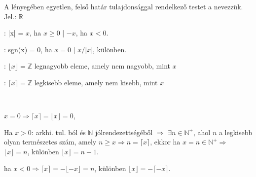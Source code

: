 \begin{frame}
\begin{tcolorbox}[title={Def.: Valós számok halmaza}]
  A lényegében egyetlen, felső határ tulajdonsággal rendelkező testet a  nevezzük.\\
  Jel.: $\mathbb{R}$
\end{tcolorbox}

\begin{tcolorbox}[title={Def.: néhány Függvény (?)}]
  : |x| = $x$, ha $x \geq 0$ | $-x$, ha $x < 0$.\\
  \msmallskip
  
  : sgn(x) = $0$, ha $x = 0$ | $x / |x|$, különben.\\
  \msmallskip
  
  : ${\lfloor}x{\rfloor} = \mathbb{Z}$ legnagyobb eleme, amely nem nagyobb, mint $x$\\
  \msmallskip
  
  : ${\lceil}x{\rceil} = \mathbb{Z}$ legkisebb eleme, amely nem kisebb, mint $x$\\
  \mbigskip

  \\
  \msmallskip

  $x = 0 \Rightarrow {\lceil}x{\rceil} = {\lfloor}x{\rfloor} = 0$,\\
  \msmallskip
  
  Ha $x > 0$: arkhi. tul. ból és $\mathbb{N}$ jólrendezettségéből $\Rightarrow$ ${\exists}n \in \mathbb{N}^+$, ahol $n$ a legkisebb olyan természetes szám, amely $n \geq x \Rightarrow n = {\lceil}x{\rceil}$, ekkor ha $x = n \in \mathbb{N}^+ \Rightarrow$ ${\lfloor}x{\rfloor} = n$, különben ${\lfloor}x{\rfloor} = n - 1$.\\
  \mmedskip

  ha $x < 0 \Rightarrow {\lceil}x{\rceil} = -{\lfloor}-x{\rfloor} = n$, különben ${\lfloor}x{\rfloor} = -{\lceil}-x{\rceil}$.
\end{tcolorbox}
\end{frame}


